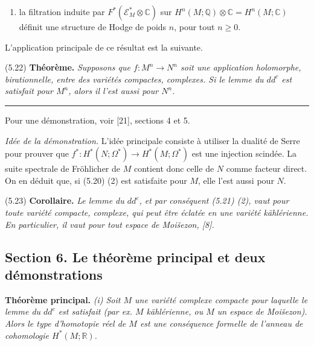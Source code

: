 \documentclass[
  french,
  a3paper,
  a3paper]{extarticle}
\providecommand{\tightlist}{%
  \setlength{\itemsep}{0pt}\setlength{\parskip}{0pt}}
\begin{document}
\begin{enumerate}
\def\labelenumi{\alph{enumi})}
\setcounter{enumi}{1}
\tightlist
\item
  la filtration induite par \(F^*(\mathscr E_M^*\otimes\mathbb C)\) sur
  \(H^n(M;\mathbb Q)\otimes\mathbb C=H^n(M;\mathbb C)\) définit une
  structure de Hodge de poids \(n\), pour tout \(n\ge0\).
\end{enumerate}

L'application principale de ce résultat est la suivante.

(5.22) \textbf{Théorème.} \emph{Supposons que
\(f:M^n\longrightarrow N^n\) soit une application holomorphe,
birationnelle, entre des variétés compactes, complexes. Si le lemme du
\(dd^c\) est satisfait pour \(M^n\), alors il l'est aussi pour \(N^n\).}

\clearpage



\par

\vspace{0.7mm}\hrule\vspace{1.6mm}

\fontsize{9}{11}\selectfont

Pour une démonstration, voir {[}21{]}, sections 4 et 5.

\emph{Idée de la démonstration.} L'idée principale consiste à utiliser
la dualité de Serre pour prouver que
\(f^*:H^*(N;\Omega^*)\longrightarrow H^*(M;\Omega^*)\) est une injection
scindée. La suite spectrale de Fröhlicher de \(M\) contient donc celle
de \(N\) comme facteur direct. On en déduit que, si (5.20) (2) est
satisfaite pour \(M\), elle l'est aussi pour \(N\).

(5.23) \textbf{Corollaire.} \emph{Le lemme du \(dd^c\), et par
conséquent (5.21) (2), vaut pour toute variété compacte, complexe, qui
peut être éclatée en une variété kählérienne. En particulier, il vaut
pour tout espace de Moišezon, {[}8{]}.}

\subsection{Section 6. Le théorème principal et deux
démonstrations}\label{section-6.-le-thuxe9oruxe8me-principal-et-deux-duxe9monstrations}

\textbf{Théorème principal.} \emph{(i) Soit \(M\) une variété complexe
compacte pour laquelle le lemme du \(dd^c\) est satisfait (par ex. \(M\)
kählérienne, ou \(M\) un espace de Moišezon). Alors le type d'homotopie
réel de \(M\) est une conséquence formelle de l'anneau de cohomologie
\(H^*(M;\mathbb R)\).}
\end{document}
